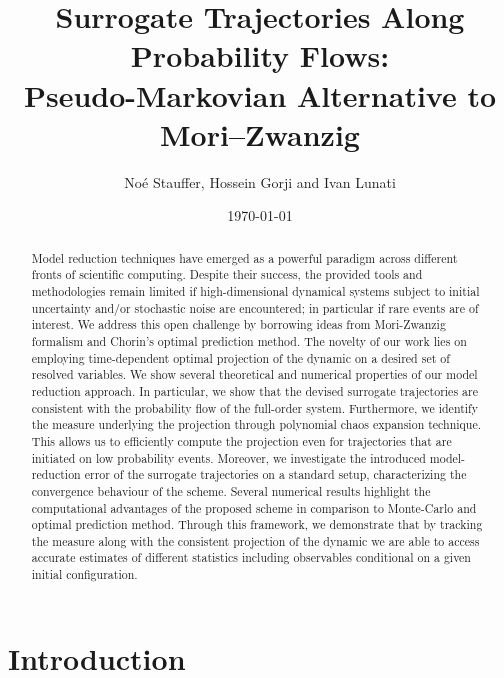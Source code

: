 \documentclass[11pt, a4paper, oneside, reqno]{amsart}
\date{\today}
\author@andify\authors
\title[Pseudo-Markovian Alternative to Mori-Zwanzig]{Surrogate Trajectories Along Probability Flows: \\ Pseudo-Markovian Alternative to Mori–Zwanzig}
\author{Noé Stauffer, Hossein Gorji and Ivan Lunati}
\begin{document}
\maketitle

\begin{abstract}
Model reduction techniques have emerged as a powerful paradigm across different fronts of scientific computing. Despite their success, the provided tools and methodologies remain limited if high-dimensional dynamical systems subject to initial uncertainty and/or stochastic noise are encountered; in particular if rare events are of interest. We address this open challenge by borrowing ideas from Mori-Zwanzig formalism and Chorin's optimal prediction method. The novelty of our work lies on employing time-dependent optimal projection of the dynamic on a desired set of resolved variables. We show several theoretical and numerical properties of our model reduction approach. In particular, we show that the devised surrogate trajectories are consistent with the probability flow of the full-order system. Furthermore, we identify the measure underlying the projection through polynomial chaos expansion technique. This allows us to efficiently compute the projection even for trajectories that are initiated on low probability events. Moreover, we investigate the introduced model-reduction error of the surrogate trajectories on a standard setup, characterizing the convergence behaviour of the scheme. Several numerical results highlight the computational advantages of the proposed scheme in comparison to Monte-Carlo and optimal prediction method. Through this framework, we demonstrate that by tracking the measure along with the consistent projection of the dynamic we are able to access accurate estimates of different statistics  including observables conditional on a given initial configuration.
\end{abstract}
\section{Introduction}
\end{document}
